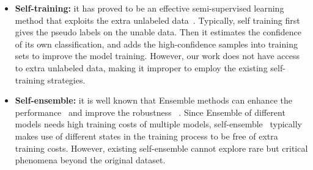 \begin{itemize}
\item \textbf{Self-training:} it has proved to be an effective semi-supervised learning method that exploits the extra unlabeled data~\cite{du2020self}. 
Typically, self training first gives the pseudo labels on the unable data. Then it estimates the confidence of its own classification, and adds the high-confidence samples into training sets to improve the model training. 
However, our work does not have access to extra unlabeled data, making it improper to employ the existing self-training strategies.

\item \textbf{Self-ensemble:} it is well known that Ensemble methods can enhance the performance~\cite{caruana2004ensemble} and improve the robustness ~\cite{tramer2017ensemble}. 
Since Ensemble of different models needs high training costs of multiple models,
self-ensemble~\cite{wang2022self} typically makes use of different states in the training process to be free of extra training costs. 
However, existing self-ensemble cannot explore rare but critical phenomena beyond
the original dataset.

\end{itemize}